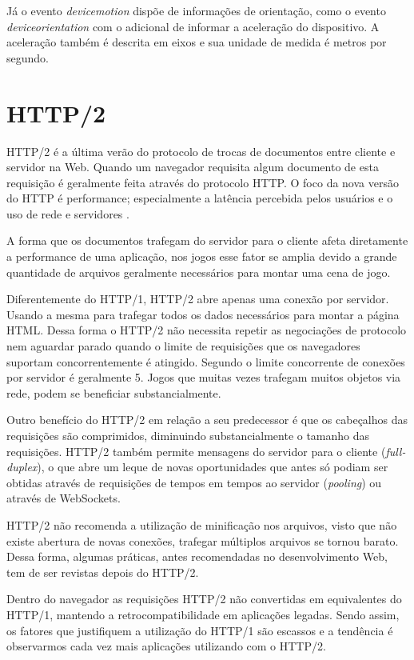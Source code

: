 Já o evento \textit{devicemotion} dispõe de informações de
orientação, como o evento \textit{deviceorientation} com o adicional
de informar a aceleração do dispositivo. A aceleração também é descrita
em eixos e sua unidade de medida é metros por segundo.

\section{HTTP/2}
HTTP/2 é a última verão do protocolo de trocas de documentos entre
cliente e servidor na Web. Quando um navegador requisita algum documento
de esta requisição é geralmente feita através do protocolo HTTP. O
foco da nova versão do HTTP é performance; especialmente a latência
percebida pelos usuários e o uso de rede e servidores \autocite{http2}.

A forma que os documentos trafegam do servidor para o
cliente afeta diretamente a performance de uma aplicação, nos jogos
esse fator se amplia devido a grande quantidade de arquivos geralmente
necessários para montar uma cena de jogo.

Diferentemente do HTTP/1, HTTP/2 abre apenas uma conexão por servidor.
Usando a mesma para trafegar todos os dados necessários para montar
a página HTML. Dessa forma o HTTP/2 não necessita repetir as
negociações de protocolo nem aguardar parado quando o limite de
requisições que os navegadores suportam concorrentemente é atingido.
Segundo \citet{gameAssetManagement} o limite concorrente de conexões
por servidor é geralmente 5. Jogos que muitas vezes trafegam muitos
objetos via rede, podem se beneficiar substancialmente.

Outro benefício do HTTP/2 em relação a seu predecessor é que
os cabeçalhos das requisições são comprimidos, diminuindo
substancialmente o tamanho das requisições. HTTP/2 também permite
mensagens do servidor para o cliente (\textit{full-duplex}), o
que abre um leque de novas oportunidades que antes só podiam ser
obtidas através de requisições de tempos em tempos ao servidor
(\textit{pooling}) ou através de WebSockets.

HTTP/2 não recomenda a utilização de minificação nos arquivos,
visto que não existe abertura de novas conexões, trafegar múltiplos
arquivos se tornou barato. Dessa forma, algumas práticas, antes
recomendadas no desenvolvimento Web, tem de ser revistas depois do
HTTP/2.

Dentro do navegador as requisições HTTP/2 não convertidas em
equivalentes do HTTP/1, mantendo a retrocompatibilidade em aplicações
legadas. Sendo assim, os fatores que justifiquem a utilização do HTTP/1
são escassos e a tendência é observarmos cada vez mais aplicações
utilizando com o HTTP/2.

